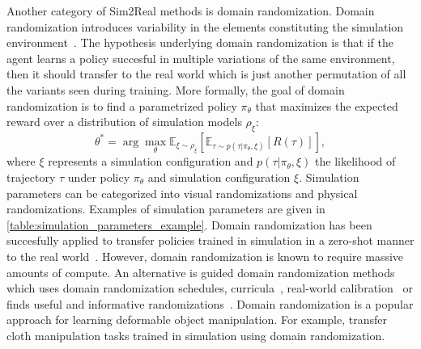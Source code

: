\documentclass[\home/main.tex]{subfiles}
\begin{document}
Another category of Sim2Real methods is domain randomization. Domain randomization introduces variability in the elements constituting the simulation environment~\autocite{tobin2017domain}. The hypothesis underlying domain randomization is that if the agent learns a policy succesful in multiple variations of the same environment, then it should transfer to the real world which is just another permutation of all the variants seen during training. More formally, the goal of domain randomization is to find a parametrized policy $\pi_{\theta}$ that maximizes the expected reward over a distribution of simulation models $\rho_{\xi}$:
\begin{equation}
	\theta^{*}=\arg \max _{\theta} \mathbb{E}_{\xi \sim \rho_{\xi}}\left[\mathbb{E}_{\tau \sim p(\tau | \pi_{\theta}, \xi)}[R(\tau)]\right],
\end{equation}
where $\xi$ represents a simulation configuration and $p(\tau | \pi_{\theta}, \xi)$ the likelihood of trajectory $\tau$ under policy $\pi_{\theta}$ and simulation configuration $\xi$. Simulation parameters can be categorized into visual randomizations and physical randomizations. Examples of simulation parameters are given in \cref{table:simulation_parameters_example}. 
Domain randomization has been succesfully applied to transfer policies trained in simulation in a zero-shot manner to the real world~\autocite{tobin2017domain, Peng2018, openai2019solving}. However, domain randomization is known to require massive amounts of compute. An alternative is guided domain randomization methods which uses domain randomization schedules, curricula~\autocite{raparthy2020generating}, real-world calibration~\autocite{chebotar2019closing} or finds useful and informative randomizations~\autocite{adr2019}. Domain randomization is a popular approach for learning deformable object manipulation. For example, \autocite{Matas2018, wu2020learning} transfer cloth manipulation tasks trained in simulation using domain randomization. 
\end{document}
